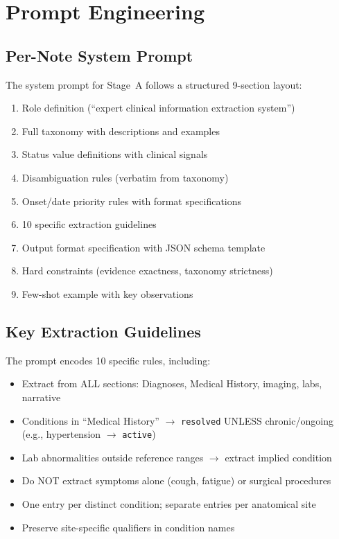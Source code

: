 \documentclass[11pt, a4paper]{article}
\begin{document}
\section{Prompt Engineering}

\subsection{Per-Note System Prompt}

The system prompt for Stage~A follows a structured 9-section layout:

\begin{enumerate}[leftmargin=1.2em, itemsep=1pt]
  \item Role definition (``expert clinical information extraction system'')
  \item Full taxonomy with descriptions and examples
  \item Status value definitions with clinical signals
  \item Disambiguation rules (verbatim from taxonomy)
  \item Onset/date priority rules with format specifications
  \item 10 specific extraction guidelines
  \item Output format specification with JSON schema template
  \item Hard constraints (evidence exactness, taxonomy strictness)
  \item Few-shot example with key observations
\end{enumerate}

\subsection{Key Extraction Guidelines}

The prompt encodes 10 specific rules, including:

\begin{itemize}[leftmargin=1.2em, itemsep=1pt]
  \item Extract from ALL sections: Diagnoses, Medical History, imaging, labs, narrative
  \item Conditions in ``Medical History'' $\rightarrow$ \texttt{resolved} UNLESS chronic/ongoing (e.g., hypertension $\rightarrow$ \texttt{active})
  \item Lab abnormalities outside reference ranges $\rightarrow$ extract implied condition
  \item Do NOT extract symptoms alone (cough, fatigue) or surgical procedures
  \item One entry per distinct condition; separate entries per anatomical site
  \item Preserve site-specific qualifiers in condition names
\end{itemize}
\end{document}
